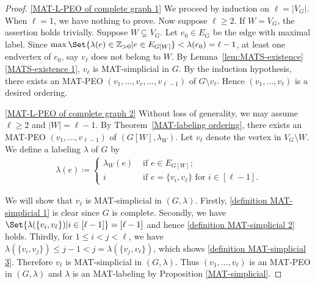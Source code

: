 \begin{proof}
\ref{MAT-L-PEO of complete graph 1}
We proceed by induction on $ \ell = |V_{G}| $. 
When $ \ell = 1 $, we have nothing to prove. 
Now suppose $ \ell \geq 2 $. 
If $ W = V_{G} $, the assertion holds trivially. 
Suppose $ W \subsetneq V_{G} $. 
Let $ e_{0}\in E_G $ be the edge with maximal label. 
Since $ \max\Set{\lambda(e) \in \mathbb{Z}_{>0} | e \in E_{G[W]}} < \lambda(e_{0}) = \ell-1 $, at least one endvertex of $ e_{0} $, say $ v_{\ell} $  does not belong to $ W $. 
By Lemma~\ref{lem:MATS-existence}\ref{MATS-existence 1}, $ v_{\ell} $ is MAT-simplicial in $ G $. 
By the induction hypothesis, there exists an MAT-PEO $ (v_{1}, \dots, v_{r}, \dots, v_{\ell-1}) $ of $ G\setminus v_{\ell} $. 
Hence $ (v_{1}, \dots, v_{\ell}) $ is a desired ordering. 

\ref{MAT-L-PEO of complete graph 2} 
Without loss of generality, we may assume $ \ell \geq 2 $ and $|W| = \ell - 1 $. 
By Theorem~\ref{MAT-labeling ordering}, there exists an MAT-PEO $ (v_{1}, \dots, v_{\ell-1}) $ of $ (G[W], \lambda_{W}) $.
Let $ v_{\ell} $ denote the vertex in $ V_{G}\setminus W $. 
We define a labeling $ \lambda $ of $ G $ by 
\begin{align*}
\lambda(e) \coloneqq
\begin{cases}
\lambda_{W}(e) & \text{ if } e \in E_{G[W]}; \\
i &  \text{ if } e = \{v_{i}, v_{\ell}\} \text{ for } i \in  [\ell -1]. 
\end{cases}
\end{align*}

We will show that $ v_{\ell} $ is MAT-simplicial in $ (G,\lambda) $. 
Firstly, \ref{definition MAT-simplicial 1} is clear since $ G $ is complete. 
Secondly, we have $ \Set{\lambda(\{v_{i}, v_{\ell}\}) | i \in [\ell-1]} = [\ell-1] $ and hence \ref{definition MAT-simplicial 2} holds. 
Thirdly, for $ 1\le i < j < \ell $, we have $ \lambda(\{v_{i}, v_{j}\}) \leq j-1 < j = \lambda(\{v_{j}, v_{\ell}\}) $, which shows \ref{definition MAT-simplicial 3}. 
Therefore $ v_{\ell} $ is MAT-simplicial in $ (G,\lambda) $. 
Thus $ (v_{1}, \dots, v_{\ell} )$ is an MAT-PEO in $ (G, \lambda) $ and $ \lambda $ is an MAT-labeling by Proposition \ref{MAT-simplicial}.
\end{proof}


